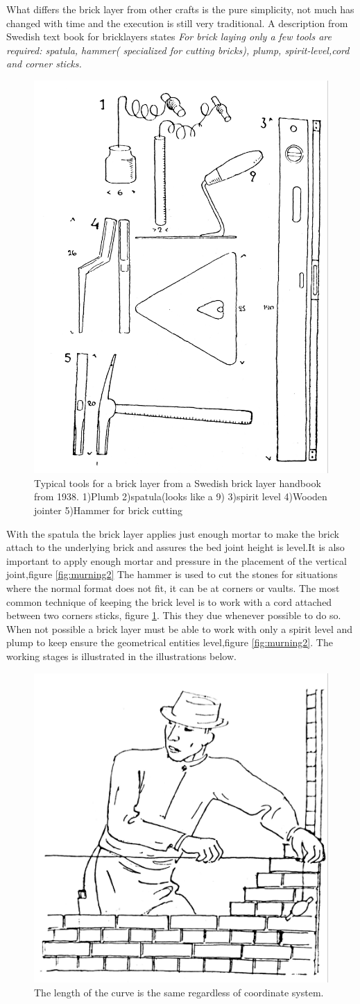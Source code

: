 What differs the brick layer from other crafts is the pure simplicity, not much has changed with time and the execution is still very traditional. A description from Swedish text book for bricklayers states \textit{ For brick laying only a few tools are required: spatula, hammer( specialized for cutting bricks), plump, spirit-level,cord and corner sticks\cite{ref:murning}.}

\begin{figure}[H]
\centering
\includegraphics[width=0.4\linewidth ]{figure/Introduction/tools2.pdf}
\caption{Typical tools for a brick layer from a Swedish  brick layer handbook from 1938. 1)Plumb 2)spatula(looks like a 9) 3)spirit level 4)Wooden jointer 5)Hammer for brick cutting  \cite{ref:murning}}
\end{figure}

With the spatula the brick layer applies just enough mortar to make the brick attach to the underlying brick and assures the bed joint height is level.It is also important to apply enough mortar and pressure in the placement of the vertical joint,figure \ref{fig:murning2}  The hammer is used to cut the stones for situations where the normal format does not fit, it can be at corners or vaults.
The most common technique of keeping the brick level is to work with a cord attached between two corners sticks, figure \ref{fig:murning}. This they due whenever possible  to do so. When not possible a brick layer must be able to work with only a spirit level and plump to keep ensure the geometrical entities level,figure \ref{fig:murning2}. The working stages is illustrated in the illustrations below.  

\begin{figure}[H]
\centering
\includegraphics[width=0.40\linewidth ]{figure/Introduction/bricklay4.pdf}
\caption{The length of the curve is the same regardless of coordinate system.\cite{ref:murning}}
\label{fig:murning}
\end{figure}

